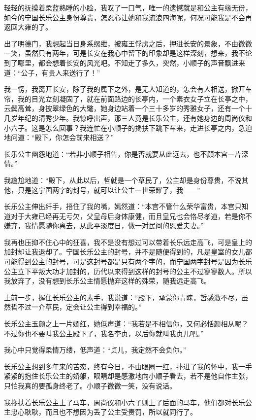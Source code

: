 轻轻的抚摸着柔蓝熟睡的小脸，我叹了一口气，唯一的遗憾就是和公主有缘无份，如今的宁国长乐公主身份尊贵，怎忍心让她和我流浪四海呢，何况可能我是不会再返回大雍的了。

出了明德门，我想起当日身系缧绁，被雍王俘虏之后，押进长安的景象，不由微微一笑，虽然只有两年，可是长安在我心中留下的印象却是这样深刻，想来，我不论到了哪里，都会想着长安的风光吧。不知走了多久，突然，小顺子的声音飘进来道：“公子，有贵人来送行了！”

我一愣，我离开长安，除了我的属下之外，是无人知道的，怎会有人相送，掀开车帘，我的目光立刻凝固了，就在前面路边的长亭内，一个素衣女子立在长亭之中，云鬓高耸，身披翠绿色的大氅，她身边站着一个三十多岁的秀雅女子，还有一个十几岁年纪的清秀少年。我惊呼出声，那三人竟是长乐公主，还有她身边的周尚仪和小六子。这是怎么回事？我连忙在小顺子的搀扶下跳下车来，走进长亭之内，急迫地问道：“殿下，你怎会前来相送？”

长乐公主幽怨地道：“若非小顺子相告，你是否就要从此远去，也不顾本宫一片深情。”

我尴尬地道：“殿下，从此以后，哲就是一个草民了，公主却是身份尊贵，不说其他，只是这宁国两字的封号，就可以让公主一世荣耀了，我——”

长乐公主伸出纤手，捂住了我的嘴，嫣然道：“本宫不管什么荣华富贵，本宫只知道对于大雍已经再无亏欠，父皇母后身体康健，而且皇兄也会恪尽孝道，若是你不嫌弃，我情愿随你离去，从此平淡度日，做一对民间的恩爱夫妻。”

我再也压抑不住心中的狂喜，我不是没有想过可以带着长乐远走高飞，可是皇上的加封却让我退却了。宁国长乐公主的封号，并不是随便得到的，凡是皇室的女儿都可能得到公主的封号，可是这封号都是只有两个字的，而宁国两字封号是因为长乐公主立下平叛大功才加封的，历代以来得到这样的封号的公主不过寥寥数人。所以我放弃了，没有想到长乐公主情愿抛弃这样的殊荣，随我远走高飞。

上前一步，握住长乐公主的素手，我说道：“殿下，承蒙你青睐，哲感激不尽，虽然哲不过一介草民，定会让公主得到幸福的。”

长乐公主玉颜之上一片嫣红，她低声道：“我若是不相信你，又何必恬颜相从呢？不过你也不要叫我公主殿下了，我名李贞，以后你就叫我贞儿吧。”

我心中只觉得柔情万缕，低声道：“贞儿，我定然不会负你。”

长乐公主想到多年来的苦恋，终有今日，不由眼圈一红，扑进了我的怀中，我一手紧紧的抱住长乐公主的娇躯，眼睛却是感激地向小顺子看去，若不是他自作主张，只怕我真的要孤身终老了。小顺子微微一笑，没有说话。

我搀扶着长乐公主上了马车，周尚仪和小六子则上了后面的马车，他们都对长乐公主忠心耿耿，而且也不想因为丢了公主受责罚，所以就同行了。

